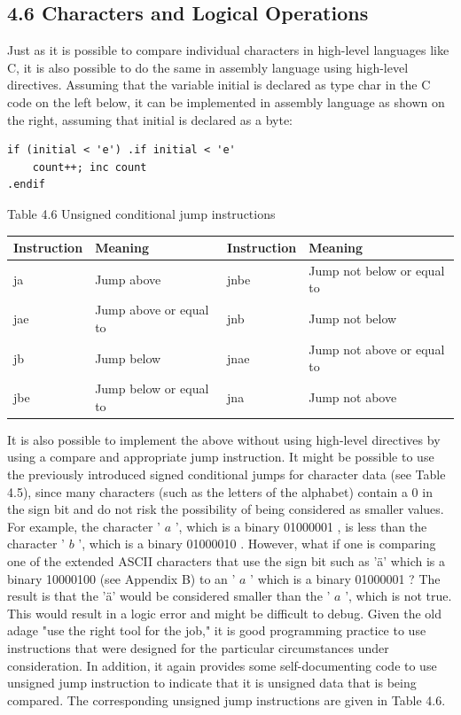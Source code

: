 \documentclass[10pt]{book}
\begin{document}
\subsection*{4.6 Characters and Logical Operations}
Just as it is possible to compare individual characters in high-level languages like C, it is also possible to do the same in assembly language using high-level directives. Assuming that the variable initial is declared as type char in the C code on the left below, it can be implemented in assembly language as shown on the right, assuming that initial is declared as a byte:

\begin{verbatim}
if (initial < 'e') .if initial < 'e'
    count++; inc count
.endif
\end{verbatim}

Table 4.6 Unsigned conditional jump instructions

\begin{center}
\begin{tabular}{|l|l|l|l|}
\hline
Instruction & Meaning & Instruction & Meaning \\

\hline
ja & Jump above & jnbe & Jump not below or equal to \\
\hline
jae & Jump above or equal to & jnb & Jump not below \\
\hline
jb & Jump below & jnae & Jump not above or equal to \\
\hline
jbe & Jump below or equal to & jna & Jump not above \\
\hline
\end{tabular}
\end{center}

It is also possible to implement the above without using high-level directives by using a compare and appropriate jump instruction. It might be possible to use the previously introduced signed conditional jumps for character data (see Table 4.5), since many characters (such as the letters of the alphabet) contain a 0 in the sign bit and do not risk the possibility of being considered as smaller values. For example, the character ' $a$ ', which is a binary 01000001 , is less than the character ' $b$ ', which is a binary 01000010 . However, what if one is comparing one of the extended ASCII characters that use the sign bit such as 'ä' which is a binary 10000100 (see Appendix B) to an ' $a$ ' which is a binary 01000001 ? The result is that the 'ä' would be considered smaller than the ' $a$ ', which is not true. This would result in a logic error and might be difficult to debug. Given the old adage "use the right tool for the job," it is good programming practice to use instructions that were designed for the particular circumstances under consideration. In addition, it again provides some self-documenting code to use unsigned jump instruction to indicate that it is unsigned data that is being compared. The corresponding unsigned jump instructions are given in Table 4.6.
\end{document}
